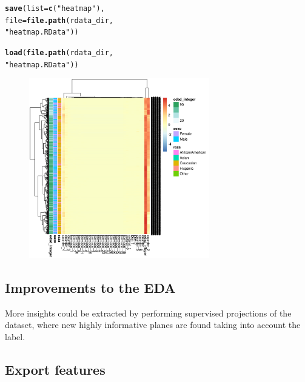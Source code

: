 \documentclass{article}\usepackage[]{graphicx}\usepackage[]{color}
\makeatletter
\newcommand{\hlstr}[1]{\textcolor[rgb]{0.192,0.494,0.8}{#1}}%
\newcommand{\hlstd}[1]{\textcolor[rgb]{0.345,0.345,0.345}{#1}}%
\newcommand{\hlkwc}[1]{\textcolor[rgb]{0.333,0.667,0.333}{#1}}%
\newcommand{\hlkwd}[1]{\textcolor[rgb]{0.737,0.353,0.396}{\textbf{#1}}}%
\newenvironment{kframe}{%
 \def\at@end@of@kframe{}%
 \ifinner\ifhmode%
  \def\at@end@of@kframe{\end{minipage}}%
  \begin{minipage}{\columnwidth}%
 \fi\fi%
 \def\FrameCommand##1{\hskip\@totalleftmargin \hskip-\fboxsep
 \colorbox{shadecolor}{##1}\hskip-\fboxsep
     \hskip-\linewidth \hskip-\@totalleftmargin \hskip\columnwidth}%
 \MakeFramed {\advance\hsize-\width
   \@totalleftmargin\z@ \linewidth\hsize
   \@setminipage}}%
 {\par\unskip\endMakeFramed%
 \at@end@of@kframe}
\newenvironment{knitrout}{}{} %
\makeatother
\begin{document}
\begin{knitrout}
\color{fgcolor}\begin{kframe}
\begin{alltt}
\hlkwd{save}\hlstd{(}\hlkwc{list} \hlstd{=} \hlkwd{c}\hlstd{(}\hlstr{"heatmap"}\hlstd{),}
    \hlkwc{file} \hlstd{=} \hlkwd{file.path}\hlstd{(rdata_dir,}
        \hlstr{"heatmap.RData"}\hlstd{))}
\end{alltt}
\end{kframe}
\end{knitrout}
\begin{knitrout}
\color{fgcolor}\begin{kframe}
\begin{alltt}
\hlkwd{load}\hlstd{(}\hlkwd{file.path}\hlstd{(rdata_dir,}
    \hlstr{"heatmap.RData"}\hlstd{))}
\end{alltt}
\end{kframe}
\end{knitrout}

\begin{figure}[!h]
\centering
\includegraphics[width=0.7\textwidth]{plots/heatmap}
\caption{}
\label{fig:heatmap}
\end{figure}

\subsection{Improvements to the EDA}

More insights could be extracted by performing supervised projections of the dataset, where new highly informative planes are found taking into account the label.

\subsection{Export features}

  
\end{document}
